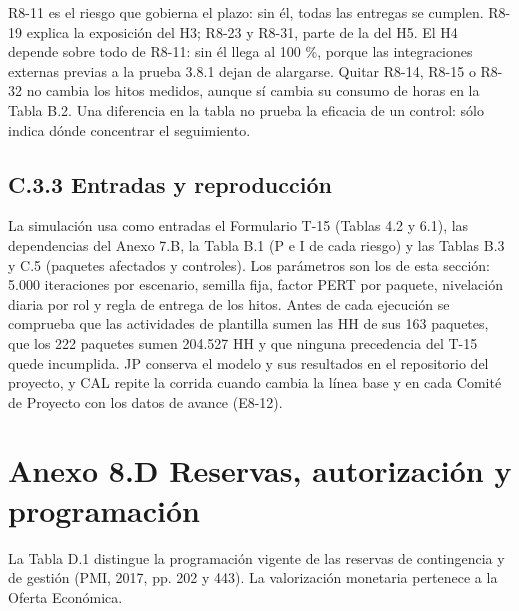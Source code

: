 R8-11 es el riesgo que gobierna el plazo: sin él, todas las entregas se cumplen. R8-19 explica la exposición del H3; R8-23 y R8-31, parte de la del H5. El H4 depende sobre todo de R8-11: sin él llega al 100 \%, porque las integraciones externas previas a la prueba 3.8.1 dejan de alargarse. Quitar R8-14, R8-15 o R8-32 no cambia los hitos medidos, aunque sí cambia su consumo de horas en la Tabla B.2. Una diferencia en la tabla no prueba la eficacia de un control: sólo indica dónde concentrar el seguimiento.

\subsection*{C.3.3 Entradas y reproducción}

La simulación usa como entradas el Formulario T-15 (Tablas 4.2 y 6.1), las dependencias del Anexo 7.B, la Tabla B.1 (P e I de cada riesgo) y las Tablas B.3 y C.5 (paquetes afectados y controles). Los parámetros son los de esta sección: 5.000 iteraciones por escenario, semilla fija, factor PERT por paquete, nivelación diaria por rol y regla de entrega de los hitos. Antes de cada ejecución se comprueba que las actividades de plantilla sumen las HH de sus 163 paquetes, que los 222 paquetes sumen 204.527 HH y que ninguna precedencia del T-15 quede incumplida. JP conserva el modelo y sus resultados en el repositorio del proyecto, y CAL repite la corrida cuando cambia la línea base y en cada Comité de Proyecto con los datos de avance (E8-12).

\clearpage
\section*{Anexo 8.D \textemdash{} Reservas, autorización y programación}

La Tabla D.1 distingue la programación vigente de las reservas de contingencia y de gestión (PMI, 2017, pp. 202 y 443). La valorización monetaria pertenece a la Oferta Económica.

